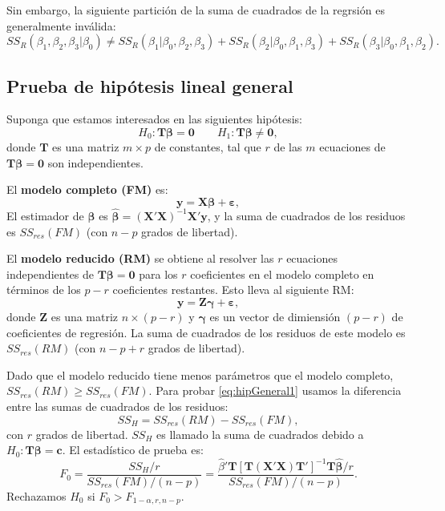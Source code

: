 \documentclass[
]{article}
\begin{document}
Sin embargo, la siguiente partición de la suma de cuadrados de la regrsión es generalmente inválida:
\[
SS_{R}(\beta_{1},\beta_{2},\beta_{3}| \beta_{0})\neq SS_{R}(\beta_{1}|\beta_{0},\beta_{2},\beta_{3}) + SS_{R}(\beta_{2}|\beta_{0},\beta_{1},\beta_{3}) + SS_{R}(\beta_{3}|\beta_{0},\beta_{1},\beta_{2}).
\]

\hypertarget{prueba-de-hipuxf3tesis-lineal-general}{%
\subsection{Prueba de hipótesis lineal general}\label{prueba-de-hipuxf3tesis-lineal-general}}

Suponga que estamos interesados en las siguientes hipótesis:
\begin{equation}
H_{0}: \boldsymbol T\boldsymbol \beta=\boldsymbol 0\qquad H_{1}: \boldsymbol T\boldsymbol \beta\neq \boldsymbol 0,
\label{eq:hipGeneral1}
\end{equation}
donde \(\boldsymbol T\) es una matriz \(m \times p\) de constantes, tal que \(r\) de las \(m\) ecuaciones de \(\boldsymbol T\boldsymbol \beta=\boldsymbol 0\) son independientes.

El \textbf{modelo completo (FM)} es:
\[
\boldsymbol y=\boldsymbol X\boldsymbol \beta+\boldsymbol \varepsilon,
\]
El estimador de \(\boldsymbol \beta\) es \(\widehat{\boldsymbol \beta}= (\boldsymbol X'\boldsymbol X)^{-1}\boldsymbol X'\boldsymbol y\), y la suma de cuadrados de los residuos es \(SS_{res}(FM)\) (con \(n-p\) grados de libertad).

El \textbf{modelo reducido (RM)} se obtiene al resolver las \(r\) ecuaciones independientes de \(\boldsymbol T\boldsymbol \beta= \boldsymbol 0\) para los \(r\) coeficientes en el modelo completo en términos de los \(p-r\) coeficientes restantes. Esto lleva al siguiente RM:
\[
\boldsymbol y=\boldsymbol Z\boldsymbol \gamma+\boldsymbol \varepsilon,
\]
donde \(\boldsymbol Z\) es una matriz \(n\times (p-r)\) y \(\boldsymbol \gamma\) es un vector de dimiensión \((p-r)\) de coeficientes de regresión. La suma de cuadrados de los residuos de este modelo es \(SS_{res}(RM)\) (con \(n-p+r\) grados de libertad).

Dado que el modelo reducido tiene menos parámetros que el modelo completo, \(SS_{res}(RM) \geq SS_{res}(FM)\). Para probar \eqref{eq:hipGeneral1} usamos la diferencia entre las sumas de cuadrados de los residuos:
\[
SS_{H} = SS_{res}(RM) - SS_{res}(FM),
\]
con \(r\) grados de libertad. \(SS_{H}\) es llamado la suma de cuadrados debido a \(H_{0}:\boldsymbol T\boldsymbol \beta=\boldsymbol c\). El estadístico de prueba es:
\[
F_{0} = \frac{SS_{H}/r}{SS_{res}(FM)/(n-p)} = \frac{\widehat{\beta}'\boldsymbol T[\boldsymbol T(\boldsymbol X'\boldsymbol X)\boldsymbol T']^{-1}\boldsymbol T\widehat{\boldsymbol \beta}/r}{SS_{res}(FM)/(n-p)}.
\]
Rechazamos \(H_{0}\) si \(F_{0} > F_{1-\alpha,r,n-p}\).
\end{document}

